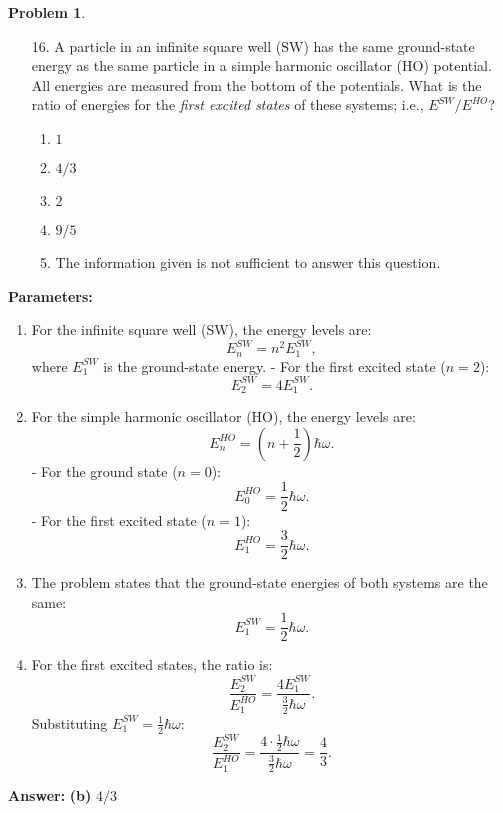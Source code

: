 \documentclass[12pt]{article}
\theoremstyle{definition} %
\newtheorem{problem}{Problem}
\theoremstyle{plain} %
\begin{document}
\begin{problem}
    \begin{enumerate}
        \item[16.] A particle in an infinite square well (SW) has the same ground-state energy as the same particle in a simple harmonic oscillator (HO) potential. All energies are measured from the bottom of the potentials. What is the ratio of energies for the \textit{first excited states} of these systems; i.e., \(E^{SW} / E^{HO}\)?
        \begin{enumerate}
            \item \(1\)
            \item \textbf{\(4/3\)}
            \item \(2\)
            \item \(9/5\)
            \item The information given is not sufficient to answer this question.
        \end{enumerate}
    \end{enumerate}
    
    \textbf{Parameters:}
    \begin{enumerate}
        \item For the infinite square well (SW), the energy levels are:
        $$
        E_n^{SW} = n^2 E_1^{SW},
        $$
        where \(E_1^{SW}\) is the ground-state energy.
        - For the first excited state (\(n = 2\)):
        $$
        E_2^{SW} = 4E_1^{SW}.
        $$
    
        \item For the simple harmonic oscillator (HO), the energy levels are:
        $$
        E_n^{HO} = \left(n + \frac{1}{2}\right)\hbar \omega.
        $$
        - For the ground state (\(n = 0\)):
        $$
        E_0^{HO} = \frac{1}{2}\hbar \omega.
        $$
        - For the first excited state (\(n = 1\)):
        $$
        E_1^{HO} = \frac{3}{2}\hbar \omega.
        $$
    
        \item The problem states that the ground-state energies of both systems are the same:
        $$
        E_1^{SW} = \frac{1}{2}\hbar \omega.
        $$
    
        \item For the first excited states, the ratio is:
        $$
        \frac{E^{SW}_2}{E^{HO}_1} = \frac{4E^{SW}_1}{\frac{3}{2}\hbar \omega}.
        $$
        Substituting \(E^{SW}_1 = \frac{1}{2}\hbar \omega\):
        $$
        \frac{E^{SW}_2}{E^{HO}_1} = \frac{4 \cdot \frac{1}{2}\hbar \omega}{\frac{3}{2}\hbar \omega} = \frac{4}{3}.
        $$
    \end{enumerate}
    
    \textbf{Answer:} \textbf{(b)} \(4/3\)
    
\end{problem}
\end{document}
